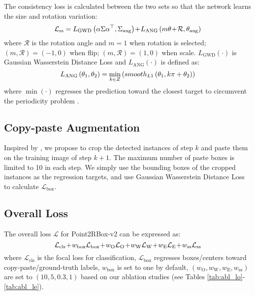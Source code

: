 The consistency loss is calculated between the two sets so that the network learns the size and rotation variation:
\begin{equation} \setlength\abovedisplayskip{6pt} \setlength\belowdisplayskip{6pt}
\mathcal{L}_\text{ss} = L_\text{GWD}\left ( \alpha\Sigma\alpha^\top, \Sigma_\text{aug} \right ) 
\!+\! L_\text{ANG}\left ( m\theta \!+\! \mathcal{R}, \theta_\text{aug} \right )
\end{equation}
where $\mathcal{R}$ is the rotation angle and $m=1$ when rotation is selected; $(m,\mathcal{R})=(-1,0)$ when flip; $(m,\mathcal{R})=(1,0)$ when scale. $L_\text{GWD}\left (\cdot\right )$ is Gaussian Wasserstein Distance Loss \cite{yang2023detecting} and $L_\text{ANG}\left (\cdot\right )$ is defined as:
\begin{equation} \setlength\abovedisplayskip{6pt} \setlength\belowdisplayskip{6pt}
L_\text{ANG}\left ( \theta_1, \theta_2 \right ) =\min_{k\in Z} \left ( smooth_{L1}\left ( \theta_1, k\pi+\theta_2  \right ) \right )
\end{equation}
where $\min\left ( \cdot \right )$ regresses the prediction toward the closest target to circumvent the periodicity problem \cite{yu2023h2rboxv2}.

\subsection{Copy-paste Augmentation}
\label{sec:method-cp}

Inspired by \cite{ghiasi2021copypaste}, we propose to crop the detected instances of step $k$ and paste them on the training image of step $k + 1$. The maximum number of paste boxes is limited to 10 in each step. We simply use the bounding boxes of the cropped instances as the regression targets, and use Gaussian Wasserstein Distance Loss \cite{yang2023detecting} to calculate $\mathcal{L}_\text{box}$.

\subsection{Overall Loss}

The overall loss $\mathcal{L}$ for Point2RBox-v2 can be expressed as:
\begin{equation} \setlength\abovedisplayskip{6pt} \setlength\belowdisplayskip{6pt}
\mathcal{L}_\text{cls}\! +\! w_\text{box} \mathcal{L}_\text{box}\! +\! w_\text{O} \mathcal{L}_\text{O}\! +\! w_\text{W} \mathcal{L}_\text{W}\! +\! w_\text{E} \mathcal{L}_\text{E}\! +\! w_\text{ss} \mathcal{L}_\text{ss}
\end{equation}
where $\mathcal{L}_\text{cls}$ is the focal loss \cite{lin2017focal} for classification, $\mathcal{L}_\text{box}$ regresses boxes/centers toward copy-paste/ground-truth labels, $w_\text{box}$ is set to one by default, $(w_\text{O},w_\text{W},w_\text{E},w_\text{ss})$ are set to $(10, 5, 0.3, 1)$ based on our ablation studies (see Tables \ref{tab:abl_lo}-\ref{tab:abl_le}).
